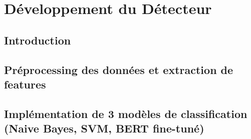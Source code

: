 \chapter{Développement du Détecteur }
\vspace{2 cm}

\section*{Introduction}
\section{Préprocessing des données et extraction de features}
\section{Implémentation de 3 modèles de classification (Naive Bayes, SVM, BERT fine-tuné)}